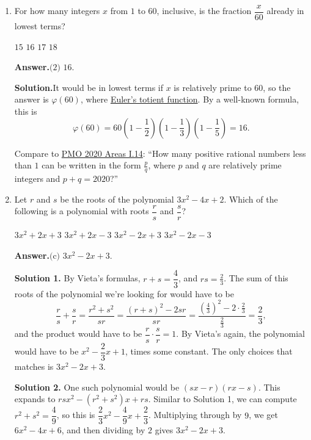 \documentclass[11pt,paper=letter]{scrartcl}
\newcommand{\ans}{{\sffamily \bfseries Answer.}\;}
\newcommand{\ansb}[2]{\ans\(\boxed{\text{(#1) #2}}\).}
\newcommand{\sol}{{\sffamily \bfseries Solution.}\;}
\newcommand{\soln}[1]{{\sffamily \bfseries Solution #1.}\;}
\newenvironment{rem}%
{\noindent \ignorespaces \small \sffamily \sansmath {\bfseries Remark.}}%
{\ignorespacesafterend}
\begin{document}
\begin{enumerate}[left=0pt]
\begin{rem}
In Solution 1 we didn't use the fact that $ABCD$ is a parallelogram at all. So the answer is the same no matter what quadrilateral $ABCD$ is, as long as $\angle BAD = 56\dg$ and the angles remain defined.
\end{rem}

\item For how many integers $x$ from $1$ to $60$, inclusive, is the fraction $\dfrac{x}{60}$ already in lowest terms?

\fourch
{$15$}
{$16$}
{$17$}
{$18$}

\ansb{2}{$16$}

\sol It would be in lowest terms if $x$ is relatively prime to $60$, so the answer is $\varphi(60)$, where \href{https://en.wikipedia.org/wiki/Euler's_totient_function}{Euler's totient function}. By a well-known formula, this is \[
  \varphi(60) = 60\left(1 - \frac{1}{2}\right)\left(1 - \frac{1}{3}\right)\left(1 - \frac{1}{5}\right) = 16.
\]

\begin{rem}
Compare to \href{https://cjquines.com/files/pmo2020areas.pdf}{PMO 2020 Areas I.14}: ``How many positive rational numbers less than $1$ can be written in the form $\frac{p}{q}$, where $p$ and $q$ are relatively prime integers and $p + q = 2020$?''
\end{rem}

\item Let $r$ and $s$ be the roots of the polynomial $3x^2 - 4x + 2$. Which of the following is a polynomial with roots $\dfrac{r}{s}$ and $\dfrac{s}{r}$?

\fourch
{$3x^2 + 2x + 3$}
{$3x^2 + 2x - 3$}
{$3x^2 - 2x + 3$}
{$3x^2 - 2x - 3$}

\ansb{c}{$3x^2 - 2x + 3$}

\soln1 By Vieta's formulas, $r + s = \dfrac{4}{3}$, and $rs = \frac{2}{3}$. The sum of this roots of the polynomial we're looking for would have to be \[
  \frac{r}{s} + \frac{s}{r} = \frac{r^2 + s^2}{sr} = \frac{(r + s)^2 - 2sr}{sr} = \frac{\left(\frac{4}{3}\right)^2 - 2 \cdot \frac{2}{3}}{\frac{2}{3}} = \frac{2}{3},
\]
and the product would have to be $\dfrac{r}{s} \cdot \dfrac{s}{r} = 1$. By Vieta's again, the polynomial would have to be $x^2 - \dfrac{2}{3}x + 1$, times some constant. The only choices that matches is $3x^2 - 2x + 3$.

\soln2 One such polynomial would be $(sx - r)(rx - s)$. This expands to $rsx^2 - (r^2 + s^2)x + rs$. Similar to Solution 1, we can compute $r^2 + s^2 = \dfrac{4}{9}$, so this is $\dfrac{2}{3}x^2 - \dfrac{4}{9}x + \dfrac{2}{3}$. Multiplying through by $9$, we get $6x^2 - 4x + 6$, and then dividing by $2$ gives $3x^2 - 2x + 3$.


\end{enumerate}
\end{document}
